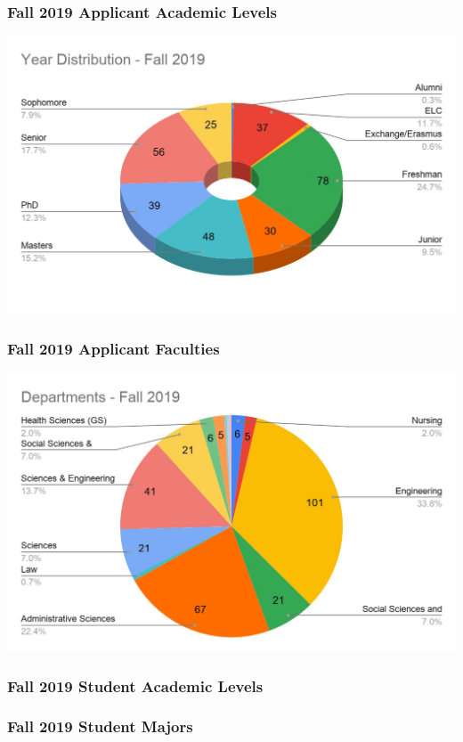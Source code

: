       
      \begin{frame}
        \frametitle{Fall 2019 Applicant Academic Levels}
        \centering
        \includegraphics[height=0.75\textheight]{images/year_distribution_fall2019.jpg}
      
      \end{frame}

      \begin{frame}
        \frametitle{Fall 2019 Applicant Faculties}
        \centering
        \includegraphics[height=0.75\textheight]{images/departments_fall2019.jpg}
      
      \end{frame}

      \begin{frame}
        \frametitle{Fall 2019 Student Academic Levels}
        
      
      \end{frame}

      \begin{frame}
        \frametitle{Fall 2019 Student Majors}
        
      
      \end{frame}


